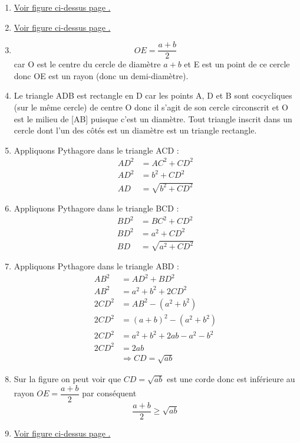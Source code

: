 \begin{enumerate}[label=C\arabic*)]
	\item \hyperref[fig:compare-means]{Voir figure ci-dessus page \pageref{fig:compare-means}.}
	\item \hyperref[fig:compare-means]{Voir figure ci-dessus page \pageref{fig:compare-means}.}
	\item \[OE = \dfrac{a + b}{2}\] car O est le centre du cercle de diamètre $a + b$ et E est un point de ce cercle donc OE est un rayon (donc un demi-diamètre).
	\item Le triangle ADB est rectangle en D car les points A, D et B sont cocycliques (sur le même cercle) de centre O donc il s'agit de son cercle circonscrit et O est le milieu de [AB] puisque c'est un diamètre. Tout triangle inscrit dans un cercle dont l'un des côtés est un diamètre est un triangle rectangle. 
	\item Appliquons Pythagore dans le triangle ACD : 
		\begin{align*}
			AD^2 &= AC^2 + CD^2 \\
			AD^2 &= b^2 + CD^2 \\
			AD &= \sqrt{b^2 + CD^2}
		\end{align*}
	\item Appliquons Pythagore dans le triangle BCD : 
		\begin{align*}
			BD^2 &= BC^2 + CD^2 \\
			BD^2 &= a^2 + CD^2 \\
			BD &= \sqrt{a^2 + CD^2}
		\end{align*}
	\item Appliquons Pythagore dans le triangle ABD : 
		\begin{align*}
			AB^2 &= AD^2 + BD^2 \\
			AB^2 &= a^2 + b^2 + 2CD^2 \\
			2CD^2 &= AB^2 - (a^2 + b^2) \\
			2CD^2 &= (a + b)^2 - (a^2 + b^2) \\
			2CD^2 &= a^2 + b^2 + 2ab - a^2 - b^2\\
			2CD^2 &= 2ab \\
			&\Rightarrow \boxed{CD = \sqrt{ab}}
		\end{align*}
	\item Sur la figure on peut voir que $CD = \sqrt{ab}$ est une corde donc est inférieure au rayon $OE = \dfrac{a + b}{2}$ par conséquent \[\dfrac{a + b}{2}\geq \sqrt{ab}\]
	\item \hyperref[fig:compare-means]{Voir figure ci-dessus page \pageref{fig:compare-means}.} 

\end{enumerate}

